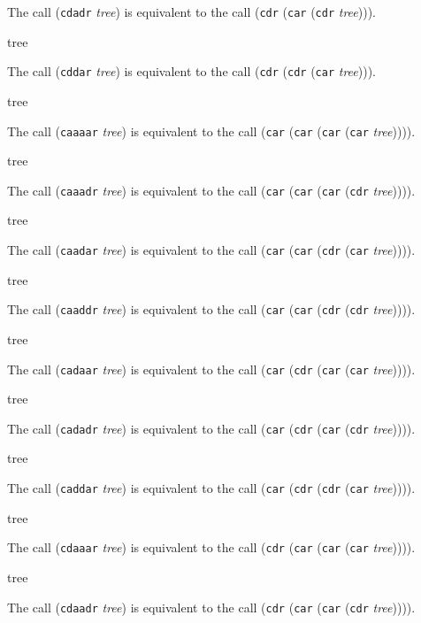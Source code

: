 The call (\texttt{cdadr} \textit{tree}) is equivalent to the call
(\texttt{cdr} (\texttt{car} (\texttt{cdr} \textit{tree}))).


 {tree}

The call (\texttt{cddar} \textit{tree}) is equivalent to the call
(\texttt{cdr} (\texttt{cdr} (\texttt{car} \textit{tree}))).

 {tree}

The call (\texttt{caaaar} \textit{tree}) is equivalent to the call
(\texttt{car} (\texttt{car} (\texttt{car} (\texttt{car}
\textit{tree})))).

 {tree}

The call (\texttt{caaadr} \textit{tree}) is equivalent to the call
(\texttt{car} (\texttt{car} (\texttt{car} (\texttt{cdr}
\textit{tree})))).

 {tree}

The call (\texttt{caadar} \textit{tree}) is equivalent to the call
(\texttt{car} (\texttt{car} (\texttt{cdr} (\texttt{car}
\textit{tree})))).

 {tree}

The call (\texttt{caaddr} \textit{tree}) is equivalent to the call
(\texttt{car} (\texttt{car} (\texttt{cdr} (\texttt{cdr}
\textit{tree})))).

 {tree}

The call (\texttt{cadaar} \textit{tree}) is equivalent to the call
(\texttt{car} (\texttt{cdr} (\texttt{car} (\texttt{car}
\textit{tree})))).

 {tree}

The call (\texttt{cadadr} \textit{tree}) is equivalent to the call
(\texttt{car} (\texttt{cdr} (\texttt{car} (\texttt{cdr}
\textit{tree})))).

 {tree}

The call (\texttt{caddar} \textit{tree}) is equivalent to the call
(\texttt{car} (\texttt{cdr} (\texttt{cdr} (\texttt{car}
\textit{tree})))).

 {tree}

The call (\texttt{cdaaar} \textit{tree}) is equivalent to the call
(\texttt{cdr} (\texttt{car} (\texttt{car} (\texttt{car}
\textit{tree})))).


 {tree}

The call (\texttt{cdaadr} \textit{tree}) is equivalent to the call
(\texttt{cdr} (\texttt{car} (\texttt{car} (\texttt{cdr}
\textit{tree})))).
